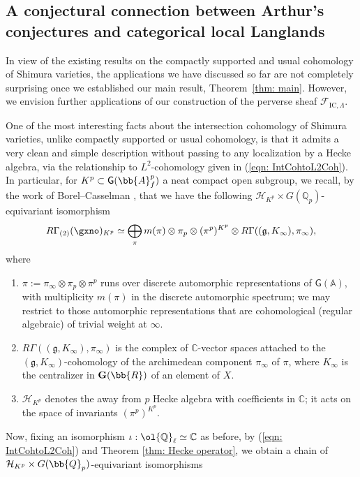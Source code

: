 \documentclass[letterpaper,11pt]{amsart}
\begin{document}
\subsection{A conjectural connection between Arthur's conjectures and categorical local Langlands}{\label{ss: EigensheafConjecture}
In view of the existing results on the compactly supported and usual cohomology of Shimura varieties, the applications we have discussed so far are not completely surprising once we established our main result, Theorem~\ref{thm: main}. However, we envision further applications of our construction of the perverse sheaf $\mathcal{F}_{\mathrm{IC},\Lambda}$. 

One of the most interesting facts about the intersection cohomology of Shimura varieties, unlike compactly supported or usual cohomology, is that it admits a very clean and simple description without passing to any localization by a Hecke algebra, via the relationship to $L^{2}$-cohomology given in (\ref{eqn: IntCohtoL2Coh}).  In particular, for $K^{p} \subset \mathsf{G}(\bb{A}_{f}^{p})$ a neat compact open subgroup, we recall, by the work of Borel--Casselman \cite{BorelCasselman}, that we have the following $\mathcal{H}_{K^{p}} \times G(\mathbb{Q}_{p})$-equivariant isomorphism 
\begin{equation}{\label{eqn: BorelCasselman}}
 R\Gamma_{(2)}(\gxno)_{K^{p}} \simeq \bigoplus_{\pi} m(\pi) \otimes \pi_{p} \otimes (\pi^{p})^{K^{p}} \otimes R\Gamma((\mathfrak{g},K_{\infty}),\pi_{\infty}), 
\end{equation}
where 
\begin{enumerate}
\item $\pi := \pi_{\infty} \otimes \pi_{p} \otimes \pi^{p}$ runs over discrete automorphic representations of $\mathsf{G}(\mathbb{A})$, with multiplicity $m(\pi)$ in the discrete automorphic spectrum; we may restrict to those automorphic representations that are cohomological (regular algebraic) of trivial weight at $\infty$.
\item $R\Gamma((\mathfrak{g},K_{\infty}),\pi_{\infty})$ is the complex of $\mathbb{C}$-vector spaces attached to the  $(\mathfrak{g},K_{\infty})$-cohomology of the archimedean component $\pi_{\infty}$ of $\pi$, where $K_{\infty}$ is the centralizer in $\mathbf{G}(\bb{R})$ of an element of $X$.
\item $\mathcal{H}_{K^{p}}$ denotes the away from $p$ Hecke algebra with coefficients in $\mathbb{C}$; it acts on the space of invariants $(\pi^p)^{K^p}$. 
\end{enumerate}
Now, fixing an isomorphism  $\iota: \ol{\mathbb{Q}}_{\ell} \simeq \mathbb{C}$ as before, by (\ref{eqn: IntCohtoL2Coh}) and Theorem \ref{thm: Hecke operator}, we obtain a chain of $\mathcal{H}_{K^p} \times G(\bb{Q}_{p})$-equivariant isomorphisms
}
\end{document}
